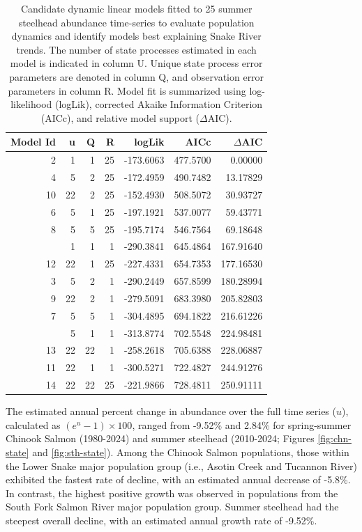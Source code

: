 \documentclass[12pt,a4paper]{article}
\begin{document}
\begin{table}

\caption{Candidate dynamic linear models fitted to 25 summer steelhead abundance time-series to evaluate population dynamics and identify models best explaining Snake River trends. The number of state processes estimated in each model is indicated in column U. Unique state process error parameters are denoted in column Q, and observation error parameters in column R. Model fit is summarized using log-likelihood (logLik), corrected Akaike Information Criterion (AICc), and relative model support ($\Delta$AIC).}
\centering
\begin{tabular}[t]{rrrrrrr}
\toprule
Model Id & u & Q & R & logLik & AICc & $\Delta$AIC\\
\midrule
2 & 1 & 1 & 25 & -173.6063 & 477.5700 & 0.00000\\
4 & 5 & 2 & 25 & -172.4959 & 490.7482 & 13.17829\\
10 & 22 & 2 & 25 & -152.4930 & 508.5072 & 30.93727\\
6 & 5 & 1 & 25 & -197.1921 & 537.0077 & 59.43771\\
8 & 5 & 5 & 25 & -195.7174 & 546.7564 & 69.18648\\
\addlinespace
1 & 1 & 1 & 1 & -290.3841 & 645.4864 & 167.91640\\
12 & 22 & 1 & 25 & -227.4331 & 654.7353 & 177.16530\\
3 & 5 & 2 & 1 & -290.2449 & 657.8599 & 180.28994\\
9 & 22 & 2 & 1 & -279.5091 & 683.3980 & 205.82803\\
7 & 5 & 5 & 1 & -304.4895 & 694.1822 & 216.61226\\
\addlinespace
5 & 5 & 1 & 1 & -313.8774 & 702.5548 & 224.98481\\
13 & 22 & 22 & 1 & -258.2618 & 705.6388 & 228.06887\\
11 & 22 & 1 & 1 & -300.5271 & 722.4827 & 244.91276\\
14 & 22 & 22 & 25 & -221.9866 & 728.4811 & 250.91111\\
\bottomrule
\end{tabular}
\end{table}

The estimated annual percent change in abundance over the full time series (\(u\)), calculated as \((e^u - 1) \times 100\), ranged from -9.52\% and 2.84\% for spring-summer Chinook Salmon (1980-2024) and summer steelhead (2010-2024; Figures \ref{fig:chn-state} and \ref{fig:sth-state}). Among the Chinook Salmon populations, those within the Lower Snake major population group (i.e., Asotin Creek and Tucannon River) exhibited the fastest rate of decline, with an estimated annual decrease of -5.8\%. In contrast, the highest positive growth was observed in populations from the South Fork Salmon River major population group. Summer steelhead had the steepest overall decline, with an estimated annual growth rate of -9.52\%.
\end{document}
